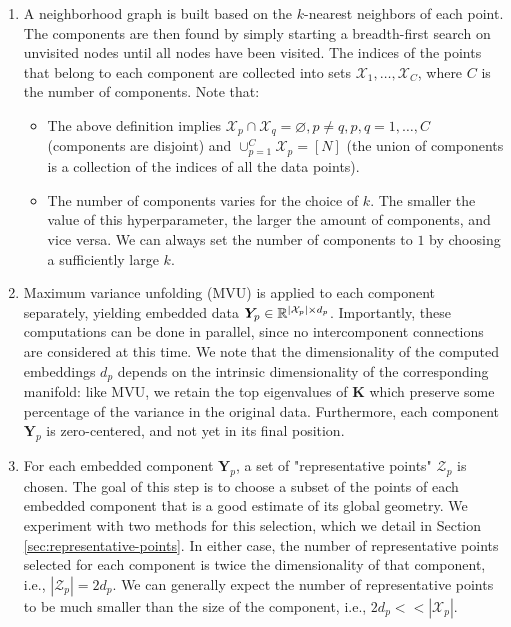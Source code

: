 \documentclass{article} %
\begin{document}
\begin{enumerate}
    \item A neighborhood graph is built based on the $k$-nearest neighbors of each point. The components are then found by simply starting a breadth-first search on unvisited nodes until all nodes have been visited. The indices of the points that belong to each component are collected into sets $\mathcal{X}_1,\dotsc,\mathcal{X}_C$, where $C$ is the number of components. Note that: \begin{itemize}
        \item The above definition implies $\mathcal{X}_p\cap\mathcal{X}_q=\varnothing,p\neq q,p,q=1,\dotsc,C$ (components are disjoint) and $\cup_{p=1}^C \mathcal{X}_p = [N]$ (the union of components is a collection of the indices of all the data points).
        \item The number of components varies for the choice of $k$. The smaller the value of this hyperparameter, the larger the amount of components, and vice versa. We can always set the number of components to $1$ by choosing a sufficiently large $k$.
    \end{itemize}
    \item Maximum variance unfolding (MVU) is applied to each component separately, yielding embedded data $\bm{Y}_p\in\mathbb{R}^{|\mathcal{X}_p|\times d_p}$. Importantly, these computations can be done in parallel, since no intercomponent connections are considered at this time. We note that the dimensionality of the computed embeddings $d_p$ depends on the intrinsic dimensionality of the corresponding manifold: like MVU, we retain the top eigenvalues of $\bm{K}$ which preserve some percentage of the variance in the original data. Furthermore, each component $\bm{Y}_p$ is zero-centered, and not yet in its final position.
    \item For each embedded component $\bm{Y}_p$, a set of "representative points" $\mathcal{Z}_p$ is chosen. The goal of this step is to choose a subset of the points of each embedded component that is a good estimate of its global geometry. We experiment with two methods for this selection, which we detail in Section \ref{sec:representative-points}. In either case, the number of representative points selected for each component is twice the dimensionality of that component, i.e., $|\mathcal{Z}_p|=2d_p$. We can generally expect the number of representative points to be much smaller than the size of the component, i.e., $2d_p<<|\mathcal{X}_p|$.

\end{enumerate}
\end{document}
